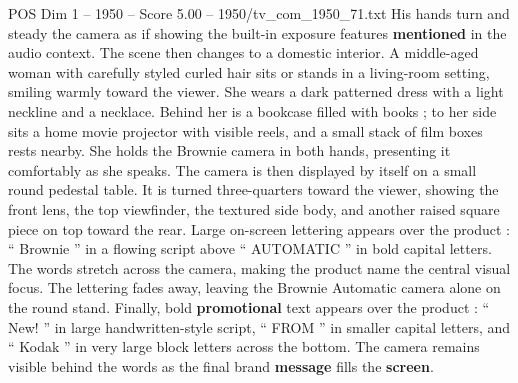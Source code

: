 \begin{textsample}{POS Dim 1 – 1950 – Score 5.00 – 1950/tv\_com\_1950\_71.txt}
His hands turn and steady the camera as if showing the built-in exposure features \textbf{mentioned} in the audio context.
The scene then changes to a domestic interior.
A middle-aged woman with carefully styled curled hair sits or stands in a living-room setting, smiling warmly toward the viewer.
She wears a dark patterned dress with a light neckline and a necklace.
Behind her is a bookcase filled with books ; to her side sits a home movie projector with visible reels, and a small stack of film boxes rests nearby.
She holds the Brownie camera in both hands, presenting it comfortably as she speaks.
The camera is then displayed by itself on a small round pedestal table.
It is turned three-quarters toward the viewer, showing the front lens, the top viewfinder, the textured side body, and another raised square piece on top toward the rear.
Large on-screen lettering appears over the product : “ Brownie ” in a flowing script above “ AUTOMATIC ” in bold capital letters.
The words stretch across the camera, making the product name the central visual focus.
The lettering fades away, leaving the Brownie Automatic camera alone on the round stand.
Finally, bold \textbf{promotional} text appears over the product : “ New! ” in large handwritten-style script, “ FROM ” in smaller capital letters, and “ Kodak ” in very large block letters across the bottom.
The camera remains visible behind the words as the final brand \textbf{message} fills the \textbf{screen}.

\end{textsample}
